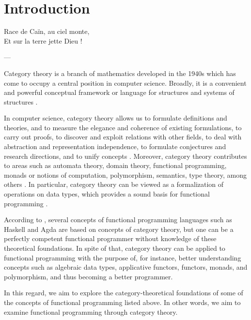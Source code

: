 \chapter{Introduction}
\label{chap:introduction}

\epigraph{
  Race de Caïn, au ciel monte,\\
  Et sur la terre jette Dieu !
}{---\textcite[16]{baudelaire-1857}}


Category theory is a branch of mathematics developed in the 1940s
which has come to occupy a central position in computer science.
Broadly, it is a convenient and powerful conceptual framework or
language for structures and systems of structures
\parencites[vii]{maclane-1998}[1]{marquis-2013}[1154]{wolfram-2002}.

In computer science, category theory allows us to formulate
definitions and theories, and to measure the elegance and coherence of
existing formulations, to carry out proofs, to discover and exploit
relations with other fields, to deal with abstraction and
representation independence, to formulate conjectures and research
directions, and to unify concepts \parencites[49--50]{goguen-1991}.
Moreover, category theory contributes to areas such as automata
theory, domain theory, functional programming, monads or notions of
computation, polymorphism, semantics, type theory, among others
\parencites[23]{marquis-2013}{nlab-category-theory}[xi]{pierce-1991}[415]{poigne-1992}.
In particular, category theory can be viewed as a formalization of
operations on data types, which provides a sound basis for functional
programming \parencites[414]{poigne-1992}[1154]{wolfram-2002}.

According to \textcite[73]{elkins-2009}, several concepts of
functional programming languages such as Haskell
\parencite{peytonjones-2003} and Agda \parencite{norell-2007} are
based on concepts of category theory, but one can be a perfectly
competent functional programmer without knowledge of these theoretical
foundations. In spite of that, category theory can be applied to
functional programming with the purpose of, for instance, better
understanding concepts such as algebraic data types, applicative
functors, functors, monads, and polymorphism, and thus becoming a
better programmer.

In this regard, we aim to explore the category-theoretical foundations
of some of the concepts of functional programming listed above. In
other words, we aim to examine functional programming through category
theory.

